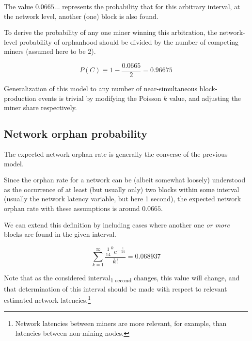 \documentclass[11pt]{article}
\theoremstyle{plain}
\newcommand{\comment}[1]{}
\begin{document}
{The value $0.0665...$ represents the probability that for this arbitrary interval,
at the network level, another (one) block is also found.

To derive the probability of any one miner winning this arbitration,
the network-level probability of orphanhood should be divided by the number
of competing miners (assumed here to be 2).

\begin{equation}
    P(C) \equiv 1 - \frac{0.0665}{2} = 0.96675
\end{equation}

Generalization of this model to any number of near-simultaneous block-production events
is trivial by modifying the Poisson $k$ value, and adjusting the miner share respectively.

\subsection{\normalsize{Network orphan probability}}

The expected network orphan rate is generally the converse of the previous model.

Since the orphan rate for a network can be (albeit somewhat loosely)
understood as the occurrence of at least (but usually only) two blocks
within some interval (usually the network latency variable, but here 1 second),
the expected network orphan rate with these assumptions is around $0.0665$.

We can extend this definition by including cases where another one \emph{or more} blocks
are found in the given interval.

\begin{equation}
    \sum_{k=1}^{\infty}\frac{\frac{1}{14}^{k}e^{-\frac{1}{14}}}{k!} = 0.068937
\end{equation}

Note that as the considered interval\textsubscript{1 second} changes, this value will change,
and that determination of this interval should be made
with respect to relevant estimated network latencies.\footnote{
Network latencies between miners are more relevant, for example,
than latencies between non-mining nodes.
}

\comment{
Given our assumption of the Poisson Distribution fit for network block intervals,
we can set Poisson's $k$ value to 2, representing the occurrence of 2 blocks.
Using the Poisson Probability Mass Function, we see that given an average block
interval of $1/14$ seconds, the probability of seeing $k=2$ blocks in some
interval $t=1$ seconds
($\lambda=\mathrm{rate}*\mathrm{interval}=1*\frac{1}{14}$) is:

}}
\end{document}
